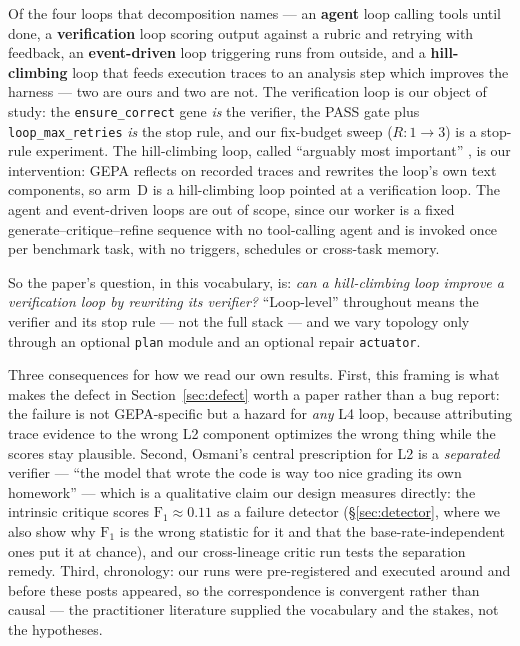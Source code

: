 \documentclass[11pt]{article}
\begin{document}
Of the four loops that decomposition names --- an \textbf{agent} loop calling tools until done, a
\textbf{verification} loop scoring output against a rubric and retrying with feedback, an
\textbf{event-driven} loop triggering runs from outside, and a \textbf{hill-climbing} loop that
feeds execution traces to an analysis step which improves the harness --- two are ours and two are
not. The verification loop is our object of study: the \texttt{ensure\_correct} gene \emph{is} the
verifier, the PASS gate plus \texttt{loop\_max\_retries} \emph{is} the stop rule, and our
fix-budget sweep ($R{:}1\!\to\!3$) is a stop-rule experiment. The hill-climbing loop, called
``arguably most important'' \citep{langchain2026loopcraft}, is our intervention: GEPA reflects on
recorded traces and rewrites the loop's own text components, so arm~D is a hill-climbing loop
pointed at a verification loop. The agent and event-driven loops are out of scope, since our worker
is a fixed generate--critique--refine sequence with no tool-calling agent and is invoked once per
benchmark task, with no triggers, schedules or cross-task memory.

So the paper's question, in this vocabulary, is: \emph{can a hill-climbing loop improve a
verification loop by rewriting its verifier?} ``Loop-level'' throughout means the verifier
and its stop rule --- not the full stack --- and we vary topology only through an optional
\texttt{plan} module and an optional repair \texttt{actuator}.

Three consequences for how we read our own results. First, this framing is what makes the
defect in Section~\ref{sec:defect} worth a paper rather than a bug report: the failure is
not GEPA-specific but a hazard for \emph{any} L4 loop, because attributing trace evidence to
the wrong L2 component optimizes the wrong thing while the scores stay plausible. Second,
Osmani's central prescription for L2 is a \emph{separated} verifier --- ``the model that
wrote the code is way too nice grading its own homework''
\citep{osmani2026loop} --- which is a qualitative claim our design measures directly: the
intrinsic critique scores $\mathrm{F}_1\!\approx\!0.11$ as a failure detector
(\S\ref{sec:detector}, where we also show why $\mathrm{F}_1$ is the wrong statistic for it and
that the base-rate-independent ones put it at chance), and our cross-lineage critic run tests
the separation remedy.
Third, chronology: our runs were pre-registered and executed around and before these posts
appeared, so the correspondence is convergent rather than causal --- the practitioner
literature supplied the vocabulary and the stakes, not the hypotheses.
\end{document}
